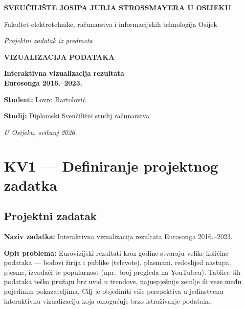 \documentclass[a4paper,11pt]{article}
\newcommand{\kv}[2]{\clearpage\section{KV#1 --- #2}}
\begin{document}
\begin{titlepage}
\centering
\vspace*{2cm}

{\Large\bfseries SVEUČILIŠTE JOSIPA JURJA STROSSMAYERA U OSIJEKU\par}
\vspace{0.4cm}
{\large Fakultet elektrotehnike, računarstva i informacijskih tehnologija Osijek\par}

\vspace{3cm}
{\itshape Projektni zadatak iz predmeta\par}
\vspace{0.6cm}
{\Huge\bfseries VIZUALIZACIJA PODATAKA\par}

\vspace{3cm}
{\LARGE\bfseries Interaktivna vizualizacija rezultata\\Eurosonga 2016.–2023.\par}

\vfill
\begin{flushleft}
\hspace{2cm}\textbf{Student:} {}Lovro Bartolović{}\par
\hspace{2cm}\textbf{Studij:} {}Diplomski Sveučilišni studij računarstva{}\par
\end{flushleft}

\vspace{2cm}
{\itshape U Osijeku, svibanj 2026.\par}
\end{titlepage}

\tableofcontents

\kv{1}{Definiranje projektnog zadatka}

\subsection{Projektni zadatak}

\textbf{Naziv zadatka:} Interaktivna vizualizacija rezultata Eurosonga 2016.–2023.

\textbf{Opis problema:} Eurovizijski rezultati kroz godine stvaraju velike količine podataka — bodovi žirija i publike (televote), plasmani, redoslijed nastupa, pjesme, izvođači te popularnost (npr.\ broj pregleda na YouTubeu). Tablice tih podataka teško pružaju brz uvid u trendove, najuspješnije zemlje ili veze među pojedinim pokazateljima. Cilj je objediniti više perspektiva u jedinstvenu interaktivnu vizualizaciju koja omogućuje brzo istraživanje podataka.
\end{document}
